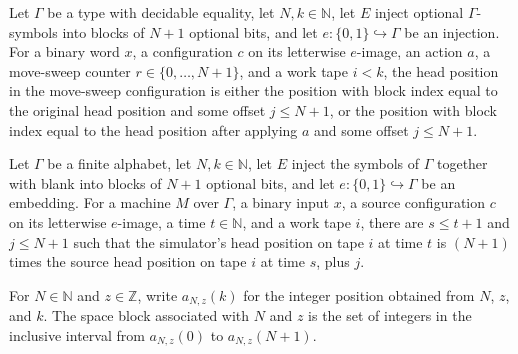 \begin{lemma}
\label{Turing.FinTM.arMoveCfg_position}
\leanok
{}
Let $\Gamma$ be a type with decidable equality, let $N,k\in\mathbb{N}$, let $E$ inject
optional $\Gamma$-symbols into blocks of $N+1$ optional bits, and let
$e:\{0,1\}\hookrightarrow\Gamma$ be an injection. For a binary word $x$, a configuration
$c$ on its letterwise $e$-image, an action $a$, a move-sweep counter
$r\in\{0,\ldots,N+1\}$, and a work tape $i<k$, the head position in the move-sweep
configuration is either the position with block index equal to the original head
position and some offset $j\le N+1$, or the position with block index equal to the head
position after applying $a$ and some offset $j\le N+1$.
\end{lemma}

\begin{lemma}
\label{Turing.FinTM.arTM_position_visited}
\leanok
{}
Let $\Gamma$ be a finite alphabet, let $N,k\in\mathbb{N}$, let $E$ inject the symbols of
$\Gamma$ together with blank into blocks of $N+1$ optional bits, and let
$e:\{0,1\}\hookrightarrow\Gamma$ be an embedding. For a machine $M$ over $\Gamma$, a
binary input $x$, a source configuration $c$ on its letterwise $e$-image, a time
$t\in\mathbb{N}$, and a work tape $i$, there are $s\le t+1$ and $j\le N+1$ such that the
simulator's head position on tape $i$ at time $t$ is $(N+1)$ times the source head
position on tape $i$ at time $s$, plus $j$.
\end{lemma}

\begin{definition}
\label{Turing.FinTM.arSpaceBlock}
\leanok
{}
For $N \in \mathbb{N}$ and $z \in \mathbb{Z}$, write $a_{N,z}(k)$ for the integer
position obtained from $N$, $z$, and $k$. The space block associated with $N$ and $z$ is
the set of integers in the inclusive interval from $a_{N,z}(0)$ to $a_{N,z}(N+1)$.
\end{definition}

